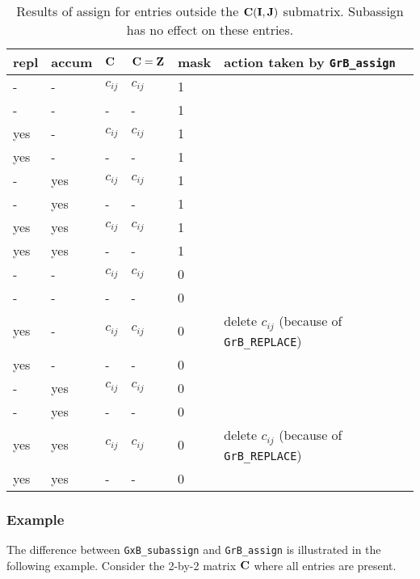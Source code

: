 \documentclass[12pt]{article}
\begin{document}
\begin{table}
{\small
\begin{tabular}{lllll|l}
\hline
repl & accum & ${\bf C}$ & ${\bf C=Z}$ & mask & action taken by \verb'GrB_assign' \\
\hline
   -   &-     & $c_{ij}$ & $c_{ij}$ & 1 &  \\
   -   &-     &  -       & -        & 1 &  \\
\hline
   yes &  -   & $c_{ij}$ & $c_{ij}$ & 1 &  \\
   yes &  -   &    -     &     -    & 1 &  \\
\hline
   -   &yes   & $c_{ij}$ & $c_{ij}$ & 1 &  \\
   -   &yes   &    -     &  -       & 1 &  \\
\hline
   yes &  yes & $c_{ij}$ & $c_{ij}$ & 1 &  \\
   yes &  yes &   -      &  -       & 1 &  \\
\hline
\hline
   -   &-     & $c_{ij}$ & $c_{ij}$ & 0 &  \\
   -   &-     &  -       & -        & 0 &  \\
\hline
   yes &  -   & $c_{ij}$ & $c_{ij}$ & 0 & delete $c_{ij}$  (because of \verb'GrB_REPLACE') \\
   yes &  -   &    -     &  -       & 0 &  \\
\hline
   -   &yes   & $c_{ij}$ & $c_{ij}$ & 0 &  \\
   -   &yes   &    -     &  -       & 0 &  \\
\hline
   yes &  yes & $c_{ij}$ & $c_{ij}$ & 0 & delete $c_{ij}$  (because of \verb'GrB_REPLACE') \\
   yes &  yes &   -      &  -       & 0 &  \\
\hline
\end{tabular}
}
\caption{Results of assign for entries outside the
${\bf C(I,J)}$ submatrix.  Subassign has no effect on these entries. \label{outsubmatrix}}
\end{table}

\subsubsection{Example}

The difference between \verb'GxB_subassign' and \verb'GrB_assign' is
illustrated in the following example.  Consider the 2-by-2 matrix ${\bf C}$
where all entries are present.
\end{document}
